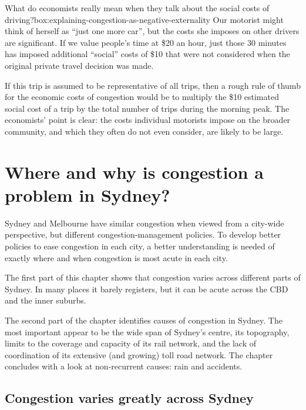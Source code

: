 \documentclass{grattan}
\begin{document}
\begin{bigbox*}{What do economists really mean when they talk about the social costs of driving?}{box:explaining-congestion-as-negative-externality}
Our motorist might think of herself as “just one more car”, but the costs she imposes on other drivers are significant.
If we value people's time at \$20 an hour, just those 30 minutes has imposed additional “social” costs of \$10 that were not considered when the original private travel decision was made.

If this trip is assumed to be representative of all trips, then a rough rule of thumb for the economic costs of congestion would be to multiply the \$10 estimated social cost of a trip by the total number of trips during the morning peak.
The economists' point is clear: the costs individual motorists impose on the broader community, and which they often do not even consider, are likely to be large.

\end{bigbox*}










\chapter{Where and why is congestion a problem in Sydney?}\label{chap:Congestion-Sydney}

Sydney and Melbourne have similar congestion when viewed from a city-wide perspective, but different congestion-management policies.
To develop better policies to ease congestion in each city,  a better understanding is needed of exactly where and when congestion is most acute in each city.

The first part of this chapter shows that congestion varies across different parts of Sydney.
In many places it barely registers, but it can be acute across the CBD and the inner suburbs.

The second part of the chapter identifies causes of congestion in Sydney.
The most important appear to be the wide span of Sydney's centre, its topography, limits to the coverage and capacity of its rail network, and the lack of coordination of its extensive (and growing) toll road network. The chapter concludes with a look at non-recurrent causes: rain and accidents.


\section{Congestion varies greatly across Sydney}
\end{document}
